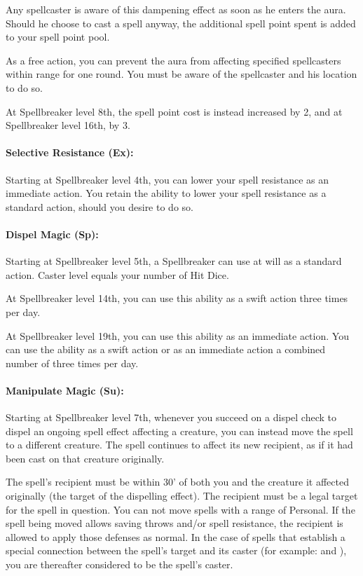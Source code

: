 Any spellcaster is aware of this dampening effect as soon as he enters the aura. Should he choose to cast a spell anyway, the additional spell point spent is added to your spell point pool.

As a free action, you can prevent the aura from affecting specified spellcasters within range for one round. You must be aware of the spellcaster and his location to do so.

At Spellbreaker level 8th, the spell point cost is instead increased by 2, and at Spellbreaker level 16th, by 3.
\paragraph{Selective Resistance (Ex):} Starting at Spellbreaker level 4th, you can lower your spell resistance as an immediate action. You retain the ability to lower your spell resistance as a standard action, should you desire to do so.

\paragraph{Dispel Magic (Sp):} Starting at Spellbreaker level 5th, a Spellbreaker can use  at will as a standard action. Caster level equals your number of Hit Dice.

At Spellbreaker level 14th, you can use this ability as a swift action three times per day.

At Spellbreaker level 19th, you can use this ability as an immediate action. You can use the ability as a swift action or as an immediate action a combined number of three times per day.
\paragraph{Manipulate Magic (Su):} Starting at Spellbreaker level 7th, whenever you succeed on a dispel check to dispel an ongoing spell effect affecting a creature, you can instead move the spell to a different creature. The spell continues to affect its new recipient, as if it had been cast on that creature originally.

The spell's recipient must be within 30' of both you and the creature it affected originally (the target of the dispelling effect).
The recipient must be a legal target for the spell in question. You can not move spells with a range of Personal. If the spell being moved allows saving throws and/or spell resistance, the recipient is allowed to apply those defenses as normal. In the case of spells that establish a special connection between the spell's target and its caster (for example:  and ), you are thereafter considered to be the spell's caster.

